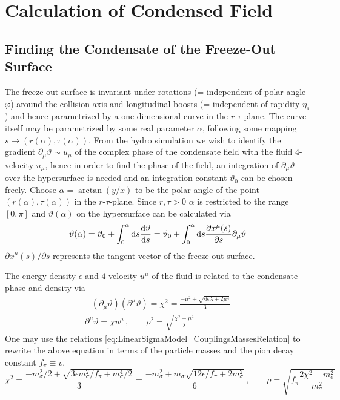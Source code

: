 \chapter{Calculation of Condensed Field}

\section{Finding the Condensate of the Freeze-Out Surface}

The freeze-out surface is invariant under rotations (= independent of polar angle $\varphi$) around the collision axis and longitudinal boosts (= independent of rapidity $\eta_s$) and hence parametrized by a one-dimensional curve in the $r\text{-}\tau$-plane. The curve itself may be parametrized by some real parameter $\alpha$, following some mapping $s\mapsto (r(\alpha),\tau(\alpha))$. From the hydro simulation we wish to identify the gradient $\partial_\mu\vartheta\sim u_\mu$ of the complex phase of the condensate field with the fluid $4$-velocity $u_\mu$, hence in order to find the phase of the field, an integration of $\partial_\mu\vartheta$ over the hypersurface is needed and an integration constant $\vartheta_0$ can be chosen freely. Choose $\alpha=\arctan(y/x)$ to be the polar angle of the point $(r(\alpha),\tau(\alpha))$ in the $r\text{-}\tau$-plane. Since $r,\tau>0$ $\alpha$ is restricted to the range $[0,\pi]$ and $\vartheta(\alpha)$ on the hypersurface can be calculated via
\begin{equation}
    \vartheta(\alpha)=\vartheta_0+\int_0^\alpha\text{d} s\frac{\text{d}\vartheta}{\text{d} s}=\vartheta_0+\int_0^\alpha\text{d} s\frac{\partial x^\mu(s)}{\partial s}\partial_\mu\vartheta
\end{equation}
$\partial x^\mu(s)/\partial s$ represents the tangent vector of the freeze-out surface.

The energy density $\epsilon$ and $4$-velocity $u^\mu$ of the fluid is related to the condensate phase and density via
\begin{subequations}
    \begin{gather}
        -(\partial_\mu\vartheta)(\partial^\mu\vartheta)=\chi^2=\frac{-\mu^2+\sqrt{6\epsilon\lambda+2\mu^4}}{3}\\
        \partial^\mu\vartheta=\chi u^\mu\,,\qquad\rho^2=\sqrt{\frac{\chi^2+\mu^2}{\lambda}}
    \end{gather}
\end{subequations}
One may use the relations \eqref{eq:LinearSigmaModel_CouplingsMassesRelation} to rewrite the above equation in terms of the particle masses and the pion decay constant $f_\pi\equiv v$.
\begin{equation}
    \chi^2=\frac{-m_\sigma^2/2+\sqrt{3\epsilon m_\sigma^2/f_\pi+m_\sigma^4/2}}{3}=\frac{-m_\sigma^2+m_\sigma\sqrt{12\epsilon/f_\pi+2m_\sigma^2}}{6}\,,\qquad\rho=\sqrt{f_\pi\frac{2\chi^2+m_\sigma^2}{m_\sigma^2}}
\end{equation}

